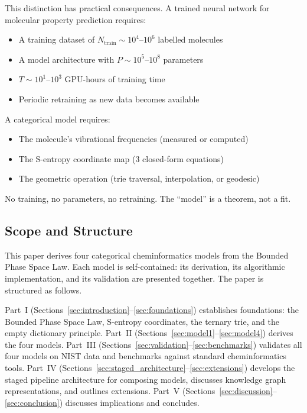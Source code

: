 \documentclass[11pt,twocolumn,a4paper]{article}
\theoremstyle{definition}
\theoremstyle{remark}
\begin{document}
This distinction has practical consequences. A trained neural network for molecular property prediction requires:
\begin{itemize}[nosep]
\item A training dataset of $N_{\mathrm{train}} \sim 10^4$--$10^6$ labelled molecules
\item A model architecture with $P \sim 10^5$--$10^8$ parameters
\item $T \sim 10^1$--$10^3$ GPU-hours of training time
\item Periodic retraining as new data becomes available
\end{itemize}

A categorical model requires:
\begin{itemize}[nosep]
\item The molecule's vibrational frequencies (measured or computed)
\item The S-entropy coordinate map (3 closed-form equations)
\item The geometric operation (trie traversal, interpolation, or geodesic)
\end{itemize}

No training, no parameters, no retraining. The ``model'' is a theorem, not a fit.

\subsection{Scope and Structure}

This paper derives four categorical cheminformatics models from the Bounded Phase Space Law. Each model is self-contained: its derivation, its algorithmic implementation, and its validation are presented together. The paper is structured as follows.

Part~I (Sections~\ref{sec:introduction}--\ref{sec:foundations}) establishes foundations: the Bounded Phase Space Law, S-entropy coordinates, the ternary trie, and the empty dictionary principle. Part~II (Sections~\ref{sec:model1}--\ref{sec:model4}) derives the four models. Part~III (Sections~\ref{sec:validation}--\ref{sec:benchmarks}) validates all four models on NIST data and benchmarks against standard cheminformatics tools. Part~IV (Sections~\ref{sec:staged_architecture}--\ref{sec:extensions}) develops the staged pipeline architecture for composing models, discusses knowledge graph representations, and outlines extensions. Part~V (Sections~\ref{sec:discussion}--\ref{sec:conclusion}) discusses implications and concludes.
\end{document}
